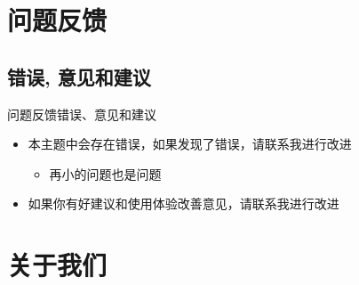 \documentclass[xcolor=svgnames, t, aspectratio=169]{ctexbeamer}
\begin{document}
\section{问题反馈}
\subsection{错误, 意见和建议}
\begin{frame}{问题反馈}{错误、意见和建议}
  \begin{itemize}
  \item 本主题中会存在错误，如果发现了错误，请联系我进行改进
    \begin{itemize}
    \item \alert{再小的问题也是问题}
    \end{itemize}
  \item 如果你有好建议和使用体验改善意见，请联系我进行改进
  \end{itemize}
\end{frame}

\section[关于我们]{关于我们}
\end{document}
